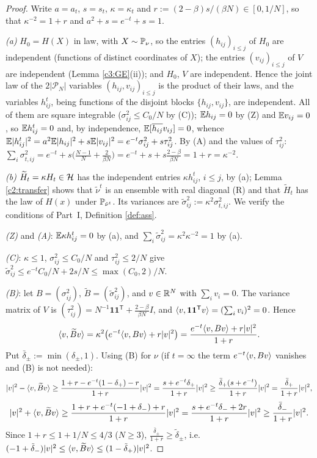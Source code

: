 \begin{proof}
Write $a=a_t$, $s=s_t$, $\kappa=\kappa_t$ and $r:=(2-\beta)s/(\beta N)\in[0,1/N]$, so that $\kappa^{-2}=1+r$ and $a^2+s=e^{-t}+s=1$.

\emph{(a)} $H_0=H(X)$ in law, with $X\sim\mathbb{P}_\nu$, so the entries $(h_{ij})_{i\le j}$ of $H_0$ are independent (functions of distinct coordinates of $X$); the entries $(v_{ij})_{i\le j}$ of $V$ are independent (Lemma \ref{c3:GE}(ii)); and $H_0$, $V$ are independent.
Hence the joint law of the $2|\mathcal P_N|$ variables $(h_{ij},v_{ij})_{i\le j}$ is the product of their laws, and the variables $h^t_{ij}$, being functions of the disjoint blocks $\{h_{ij},v_{ij}\}$, are independent.
All of them are square integrable ($\sigma_{ij}^2\le C_0/N$ by (C)); $\mathbb{E} h_{ij}=0$ by (Z) and $\mathbb{E} v_{ij}=0$, so $\mathbb{E} h^t_{ij}=0$ and, by independence, $\mathbb{E}[\overline{h_{ij}}v_{ij}]=0$, whence $\mathbb{E}|h^t_{ij}|^2=a^2\mathbb{E}|h_{ij}|^2+s\mathbb{E}|v_{ij}|^2=e^{-t}\sigma_{ij}^2+s\tau_{ij}^2$.
By (A) and the values of $\tau_{ij}^2$: $\sum_i\sigma^2_{t,ij}=e^{-t}+s\big(\frac{N-1}N+\frac2{\beta N}\big)=e^{-t}+s+s\frac{2-\beta}{\beta N}=1+r=\kappa^{-2}$.

\emph{(b)} $\widetilde H_t=\kappa H_t\in\mathcal{H}$ has the independent entries $\kappa h^t_{ij}$, $i\le j$, by (a); Lemma \ref{c2:transfer} shows that $\tilde\nu^t$ is an ensemble with real diagonal (R) and that $\widetilde H_t$ has the law of $H(x)$ under $\mathbb{P}_{\tilde\nu^t}$. Its variances are $\tilde\sigma_{ij}^2:=\kappa^2\sigma^2_{t,ij}$. We verify the conditions of Part~I, Definition \ref{def:ass}.

\emph{(Z)} and \emph{(A)}: $\mathbb{E}\kappa h^t_{ij}=0$ by (a), and $\sum_i\tilde\sigma_{ij}^2=\kappa^2\kappa^{-2}=1$ by (a).

\emph{(C)}: $\kappa\le1$, $\sigma_{ij}^2\le C_0/N$ and $\tau_{ij}^2\le2/N$ give $\tilde\sigma_{ij}^2\le e^{-t}C_0/N+2s/N\le\max(C_0,2)/N$.

\emph{(B)}: let $B=(\sigma_{ij}^2)$, $\widetilde B=(\tilde\sigma_{ij}^2)$, and $v\in\mathbb{R}^N$ with $\sum_iv_i=0$. The variance matrix of $V$ is $(\tau_{ij}^2)=N^{-1}\mathbf 1\mathbf 1^{\mathsf T}+\frac{2-\beta}{\beta N}I$, and $\langle v,\mathbf 1\mathbf 1^{\mathsf T}v\rangle=(\sum_iv_i)^2=0$. Hence
\[
\langle v,\widetilde Bv\rangle=\kappa^2\big(e^{-t}\langle v,Bv\rangle+r|v|^2\big)=\frac{e^{-t}\langle v,Bv\rangle+r|v|^2}{1+r}.
\]
Put $\bar\delta_\pm:=\min(\delta_\pm,1)$. Using (B) for $\nu$ (if $t=\infty$ the term $e^{-t}\langle v,Bv\rangle$ vanishes and (B) is not needed):
\[
|v|^2-\langle v,\widetilde Bv\rangle\ge\frac{1+r-e^{-t}(1-\delta_+)-r}{1+r}|v|^2=\frac{s+e^{-t}\delta_+}{1+r}|v|^2\ge\frac{\bar\delta_+(s+e^{-t})}{1+r}|v|^2=\frac{\bar\delta_+}{1+r}|v|^2,
\]
\[
|v|^2+\langle v,\widetilde Bv\rangle\ge\frac{1+r+e^{-t}(-1+\delta_-)+r}{1+r}|v|^2=\frac{s+e^{-t}\delta_-+2r}{1+r}|v|^2\ge\frac{\bar\delta_-}{1+r}|v|^2 .
\]
Since $1+r\le1+1/N\le4/3$ ($N\ge3$), $\frac{\bar\delta_\pm}{1+r}\ge\tilde\delta_\pm$, i.e.\ $(-1+\tilde\delta_-)|v|^2\le\langle v,\widetilde Bv\rangle\le(1-\tilde\delta_+)|v|^2$.


\end{proof}
